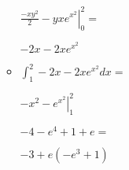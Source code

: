 \documentclass[../parcial.tex]{subfiles}
\begin{document}
\begin{enumerate}
\begin{itemize}
                    $ \left. \frac{-xy^2}{2} - yxe^{x^2} \right |_0^2 = $

                    $ -2x - 2xe^{x^2} $

                \item $ \int_1^2 -2x - 2xe^{x^2} dx = $
                
                    $ \left. -x^2 - e^{x^2} \right |_1^2  $

                    $ -4 - e^4 + 1 + e = $

                    $ -3 + e(-e^3 + 1) $

            \end{itemize}

    \end{enumerate}
\end{document}
